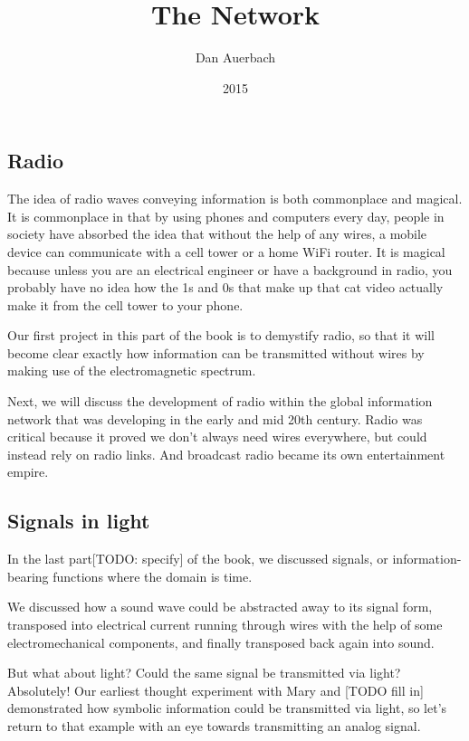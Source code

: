 \documentclass[UTF8]{book}
\begin{document}
\begin{CJK}{UTF8}{gbsn}

\title{The Network}
\author{Dan Auerbach}
\date{2015}
\maketitle

\part{Radio}

The idea of radio waves conveying information is both commonplace and magical. It is commonplace in that by using phones and computers every day, people in society have absorbed the idea that without the help of any wires, a mobile device can communicate with a cell tower or a home WiFi router. It is magical because unless you are an electrical engineer or have a background in radio, you probably have no idea how the 1s and 0s that make up that cat video actually make it from the cell tower to your phone.

Our first project in this part of the book is to demystify radio, so that it will become clear exactly how information can be transmitted without wires by making use of the electromagnetic spectrum.

Next, we will discuss the development of radio within the global information network that was developing in the early and mid 20th century. Radio was critical because it proved we don't always need wires everywhere, but could instead rely on radio links. And broadcast radio became its own entertainment empire.

\chapter{Signals in light}

In the last part[TODO: specify] of the book, we discussed signals, or information-bearing functions where the domain is time.

We discussed how a sound wave could be abstracted away to its signal form, transposed into electrical current running through wires with the help of some electromechanical components, and finally transposed back again into sound.

But what about light? Could the same signal be transmitted via light? Absolutely! Our earliest thought experiment with Mary and [TODO fill in] demonstrated how symbolic information could be transmitted via light, so let's return to that example with an eye towards transmitting an analog signal.


\end{CJK}
\end{document}
